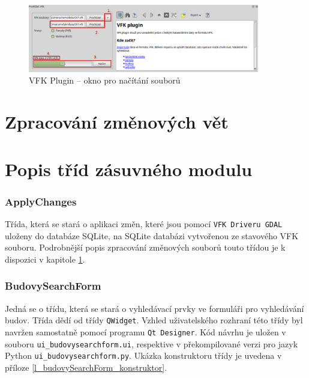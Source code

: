 \documentclass[a4paper,12pt,oneside]{book}
\begin{document}
\begin{figure}[htb]
\centering
\includegraphics[width=0.9\textwidth]{images/vfkPlugin-novy_vzhled.png}
\caption[VFK Plugin -- okno pro načítání souborů]{VFK Plugin -- okno pro načítání souborů}
\label{l_plugin_novy_vzhled}
\end{figure}








\clearpage
\section{Zpracování změnových vět}
\label{l_zpracovani_zmen}










\clearpage
\section{Popis tříd zásuvného modulu}

\subsubsection{ApplyChanges}
Třída, která se stará o aplikaci změn, které jsou pomocí \texttt{VFK Driveru GDAL} uloženy do databáze SQLite, na SQLite databázi vytvořenou ze stavového VFK souboru. Podrobnější popis zpracování změnových souborů touto třídou je k dispozici v kapitole \ref{l_zpracovani_zmen}.

\subsubsection{BudovySearchForm}
Jedná se o třídu, která se stará o vyhledávací prvky ve formuláři pro vyhledávání budov. Třída dědí od třídy \texttt{QWidget}. Vzhled uživatelského rozhraní této třídy byl navržen samostatně pomocí programu \texttt{Qt Designer}. Kód návrhu je uložen v souboru \texttt{ui\_budovysearchform.ui}, respektive v překompilované verzi pro jazyk Python \texttt{ui\_budovysearchform.py}. Ukázka konstruktoru třídy je uvedena v příloze \ref{l_budovySearchForm_konstruktor}.
\end{document}
